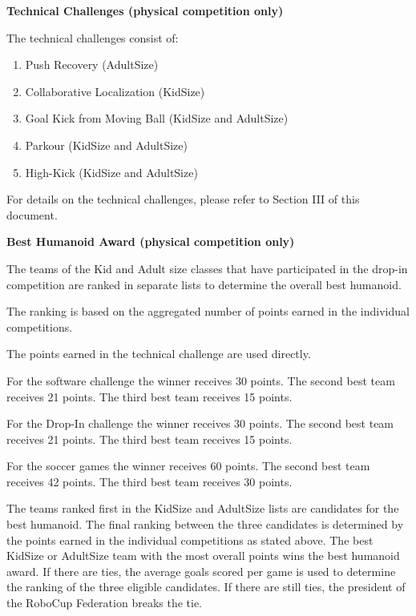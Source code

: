 \bigskip

{\bfseries Technical Challenges (physical competition only)}

\headlinebox

The technical challenges consist of:

\begin{enumerate}
\item Push Recovery (AdultSize)
\item Collaborative Localization (KidSize)
\item Goal Kick from Moving Ball (KidSize and AdultSize)
\item Parkour (KidSize and AdultSize)
\item High-Kick (KidSize and AdultSize)
\end{enumerate}

For details on the technical challenges, please refer to Section III of this document.

\bigskip

\newpage
{\bfseries Best Humanoid Award (physical competition only)}

\headlinebox
 
The teams of the Kid and Adult size classes that have
participated in the drop-in competition are ranked in separate lists to
determine the overall best humanoid.

The ranking is based on the aggregated number of points earned in the individual competitions.

\bigskip

The points earned in the technical challenge are used directly.

\bigskip

For the software challenge the winner receives 30 points. The second best team receives 21 points. The third best team receives 15 points.

\bigskip

For the Drop-In challenge the winner receives 30 points. The second best team receives 21 points. The third best team receives 15 points.


\bigskip

For the soccer games the winner receives 60 points. The second best team receives 42 points. The third best team receives 30 points.

\bigskip

The teams ranked first in the KidSize and AdultSize lists
are candidates for the best humanoid.
The final ranking between the three candidates is determined by the points
earned in the individual competitions as stated above.
The best KidSize or AdultSize team with the most overall
points wins the best humanoid award.
If there are ties, the average goals scored per game is used to determine the
ranking of the three eligible candidates.
If there are still ties, the president of the RoboCup Federation breaks the tie.

